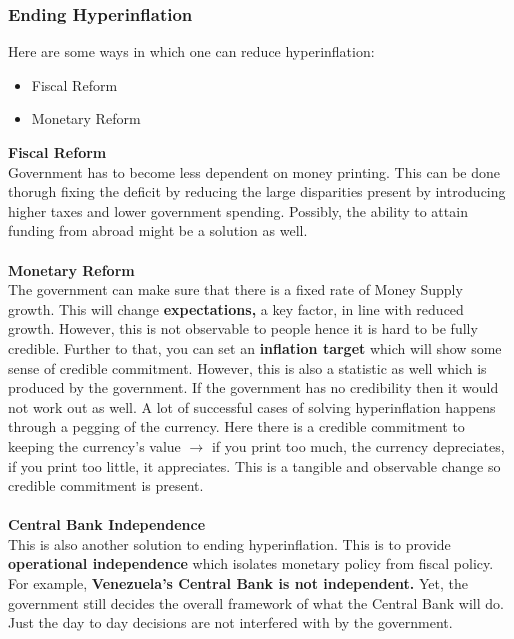 \documentclass[12pt, letterpaper]{article}
\begin{document}
\subsubsection{Ending Hyperinflation}
Here are some ways in which one can reduce hyperinflation:
\begin{itemize}
	\item Fiscal Reform
	\item Monetary Reform
\end{itemize}
\textbf{Fiscal Reform}\\
Government has to become less dependent on money printing. This can be done thorugh fixing the deficit by reducing the large disparities present by introducing higher taxes and lower government spending. Possibly, the ability to attain funding from abroad might be a solution as well.\\\\
\textbf{Monetary Reform}\\
The government can make sure that there is a fixed rate of Money Supply growth. This will change \textbf{expectations,} a key factor, in line with reduced growth. However, this is not observable to people hence it is hard to be fully credible. Further to that, you can set an \textbf{inflation target} which will show some sense of credible commitment. However, this is also a statistic as well which is produced by the government. If the government has no credibility then it would not work out as well. A lot of successful cases of solving hyperinflation happens through a pegging of the currency. Here there is a credible commitment to keeping the currency's value $\rightarrow$ if you print too much, the currency depreciates, if you print too little, it appreciates. This is a tangible and observable change so credible commitment is present.\\\\
\textbf{Central Bank Independence}\\
This is also another solution to ending hyperinflation. This is to provide \textbf{operational independence} which isolates monetary policy from fiscal policy. For example, \textbf{Venezuela's Central Bank is not independent.} Yet, the government still decides the overall framework of what the Central Bank will do. Just the day to day decisions are not interfered with by the government.
\end{document}

